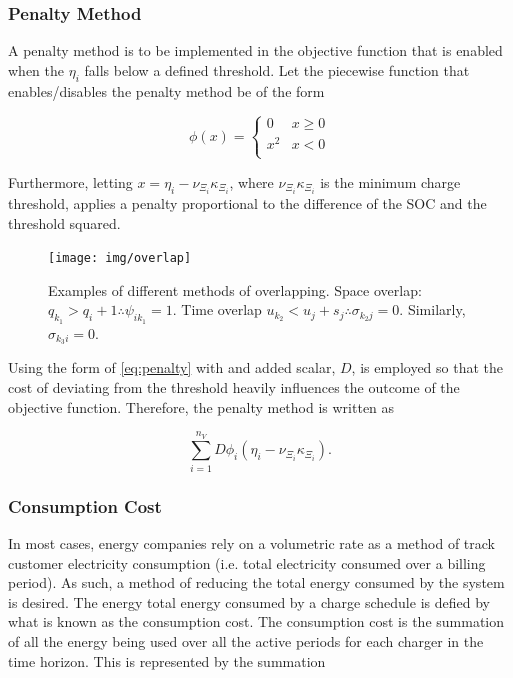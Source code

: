 \documentclass[energies,article,submit,moreauthors]{Definitions/mdpi}
\begin{document}
\subsubsection{Penalty Method}
\label{sec:penalty-method}
A penalty method is to be implemented in the objective function that is enabled when the \(\eta_i\) falls below a defined
threshold. Let the piecewise function that enables/disables the penalty method be of the form

\begin{equation}
\label{eq:penalty}
  \phi(x) =
  \begin{cases}
    0   & x \ge 0 \\
    x^2 & x < 0\\
  \end{cases}
\end{equation}

Furthermore, letting \(x = \eta_i - \nu_{\Xi_i} \kappa_{\Xi_i}\), where \(\nu_{\Xi_i} \kappa_{\Xi_i}\) is the minimum charge threshold, applies a penalty
proportional to the difference of the SOC and the threshold squared.

\begin{figure}[htpb]
  \centering \texttt{[image: img/overlap]}
  \caption{Examples of different methods of overlapping. Space overlap: $q_{k_1} > q_{i} + 1 \therefore \psi_{ik_{1}} = 1$.
    Time overlap $u_{k_2} < u_{j} + s_j \therefore \sigma_{k_{2}j} = 0$. Similarly, $\sigma_{k_3 i} = 0$.}
  \label{fig:overlap}
\end{figure}

Using the form of \ref{eq:penalty} with and added scalar, \(D\), is employed so that the cost of deviating from the threshold
heavily influences the outcome of the objective function. Therefore, the penalty method is written as

\begin{equation}
\label{eq:penalty-method}
\sum_{i=1}^{n_V} D \phi_i(\eta_i - \nu_{\Xi_i} \kappa_{\Xi_i})\text{.}
\end{equation}

\subsubsection{Consumption Cost}
\label{sec:consumpction-cost}
In most cases, energy companies rely on a volumetric rate as a method of track customer electricity consumption (i.e.
total electricity consumed over a billing period). As such, a method of reducing the total energy consumed by the system
is desired. The energy total energy consumed by a charge schedule is defied by what is known as the consumption cost.
The consumption cost is the summation of all the energy being used over all the active periods for each charger in the
time horizon. This is represented by the summation
\end{document}
